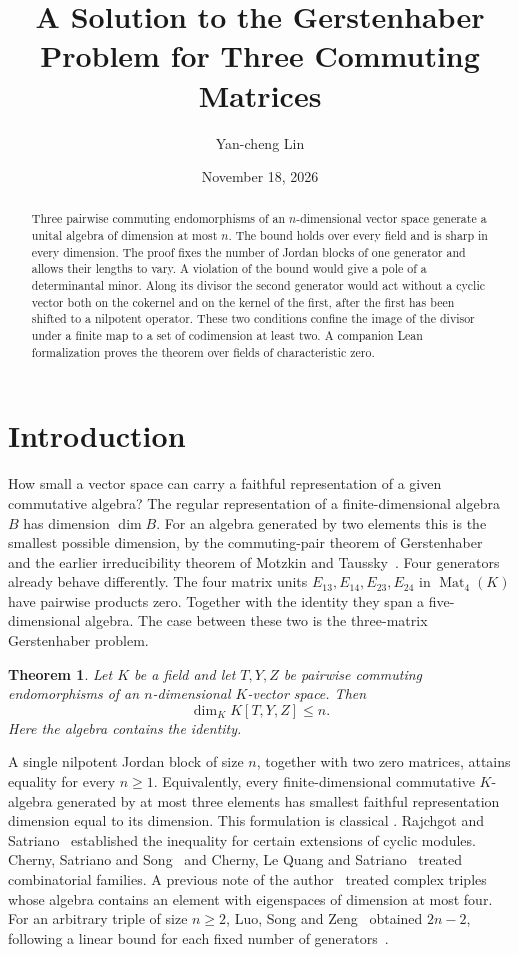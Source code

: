 \documentclass[11pt,reqno]{amsart}
\title[The Gerstenhaber Problem for Three Commuting Matrices]{A Solution to the Gerstenhaber Problem for Three Commuting Matrices}
\author{Yan-cheng Lin}
\date{November 18, 2026}
\newtheorem{theorem}{Theorem}[section]
\theoremstyle{definition}
\newcommand{\Mat}{\operatorname{Mat}}
\begin{document}
\begin{abstract}
Three pairwise commuting endomorphisms of an \(n\)-dimensional vector space
generate a unital algebra of dimension at most \(n\). The bound holds over
every field and is sharp in every dimension. The proof fixes the number of
Jordan blocks of one generator and allows their lengths to vary. A violation
of the bound would give a pole of a determinantal minor. Along its divisor
the second generator would act without a cyclic vector both on the
cokernel and on the kernel of the first, after the first has been shifted
to a nilpotent operator. These two conditions confine the image of the
divisor under a finite map to a set of codimension at least two.
A companion Lean formalization proves the theorem over fields of
characteristic zero.
\end{abstract}
\maketitle

\section{Introduction}
How small a vector space can carry a faithful representation of a given
commutative algebra? The regular representation of a finite-dimensional
algebra \(B\) has dimension \(\dim B\). For an algebra generated by two
elements this is the smallest possible dimension, by the commuting-pair
theorem of Gerstenhaber~\cite{Ger} and the earlier irreducibility theorem
of Motzkin and Taussky~\cite{MT}. Four generators already behave
differently. The four matrix units \(E_{13},E_{14},E_{23},E_{24}\) in
\(\Mat_4(K)\) have pairwise products zero. Together with the identity
they span a five-dimensional algebra. The case between these two is the
three-matrix Gerstenhaber problem.

\begin{theorem}\label{thm:main}
Let \(K\) be a field and let \(T,Y,Z\) be pairwise commuting endomorphisms
of an \(n\)-dimensional \(K\)-vector space. Then
\[
                 \dim_K K[T,Y,Z]\leq n .
\]
Here the algebra contains the identity.
\end{theorem}

A single nilpotent Jordan block of size \(n\), together with two zero
matrices, attains equality for every \(n\geq 1\).
Equivalently, every finite-dimensional commutative \(K\)-algebra generated
by at most three elements has smallest faithful representation dimension
equal to its dimension. This formulation is classical
\cite{Bergman,RS}. Rajchgot and Satriano~\cite{RS} established the
inequality for certain extensions of cyclic modules. Cherny, Satriano
and Song~\cite{CSS} and Cherny, Le Quang and Satriano~\cite{CLS} treated
combinatorial families. A previous note of the author~\cite{Lin} treated
complex triples whose algebra contains an element with eigenspaces of
dimension at most four. For an arbitrary triple of size \(n\geq2\),
Luo, Song and Zeng~\cite[Theorem~1.1]{LSZ} obtained \(2n-2\), following
a linear bound for each fixed number of generators~\cite{LLSZ}.
\end{document}
